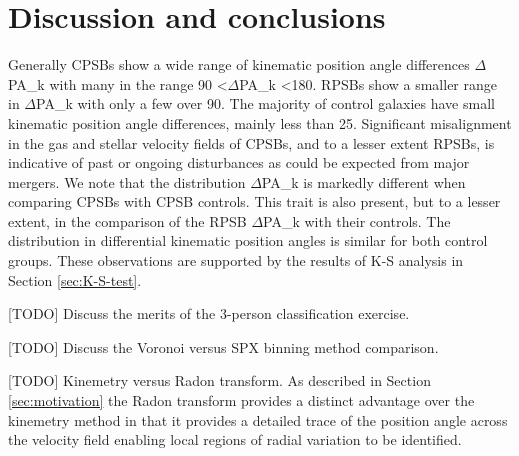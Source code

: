 \section{Discussion and conclusions}
\label{sec:discussion}

Generally CPSBs show a wide range of kinematic position angle differences $\Delta$PA\_k with many in the range 90 \textless $\Delta$PA\_k \textless 180\textdegree. RPSBs show a smaller range in $\Delta$PA\_k with only a few over 90\textdegree. The majority of control galaxies have small kinematic position angle differences, mainly less than 25\textdegree. Significant misalignment in the gas and stellar velocity fields of CPSBs, and to a lesser extent RPSBs, is indicative of past or ongoing disturbances as could be expected from major mergers. 
We note that the distribution $\Delta$PA\_k is markedly different when comparing CPSBs with CPSB controls. This trait is also present, but to a lesser extent, in the comparison of the RPSB  $\Delta$PA\_k with their controls. The distribution in differential kinematic position angles is similar for both control groups. These observations are supported by the results of K-S analysis in Section \ref{sec:K-S-test}.

[TODO] Discuss the merits of the 3-person classification exercise.

[TODO] Discuss the Voronoi versus SPX binning method comparison.

[TODO] Kinemetry versus Radon transform. As described in Section \ref{sec:motivation} the Radon transform provides a distinct advantage over the kinemetry method in that it provides a detailed trace of the position angle across the velocity field enabling local regions of radial variation to be identified. 

